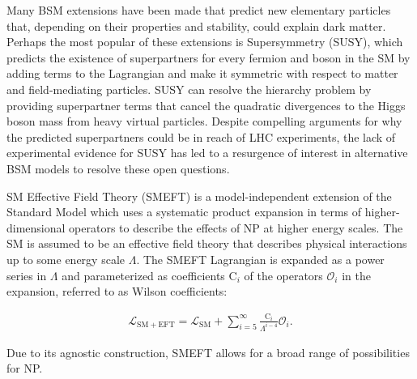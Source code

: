 Many BSM extensions have been made that predict new elementary particles that, depending on their properties and stability, could explain dark matter.
Perhaps the most popular of these extensions is Supersymmetry (SUSY), which predicts the existence of superpartners for every fermion and boson in the SM by adding terms to the Lagrangian and make it symmetric with respect to matter and field-mediating particles.
SUSY can resolve the hierarchy problem by providing superpartner terms that cancel the quadratic divergences to the Higgs boson mass from heavy virtual particles.
Despite compelling arguments for why the predicted superpartners could be in reach of LHC experiments, the lack of experimental evidence for SUSY has led to a resurgence of interest in alternative BSM models to resolve these open questions.

SM Effective Field Theory (SMEFT) is a model-independent extension of the Standard Model which uses a systematic product expansion in terms of higher-dimensional operators to describe the effects of NP at higher energy scales.  
The SM is assumed to be an effective field theory that describes physical interactions up to some energy scale $\Lambda$.
The SMEFT Lagrangian is expanded as a power series in $\Lambda$ and parameterized as coefficients $\mathrm{C}_i$ of the operators $\mathcal{O}_i$ in the expansion, referred to as Wilson coefficients:
\begin{linenomath*}
\begin{align}
    \mathcal{L}_{\mathrm{SM}+\mathrm{EFT}}=\mathcal{L}_{\mathrm{SM}}+\sum_{i=5}^{\infty} \frac{\mathrm{C}_i}{\Lambda^{i-4}} \mathcal{O}_i.
\end{align}
\end{linenomath*}
Due to its agnostic construction, SMEFT allows for a broad range of possibilities for NP.

